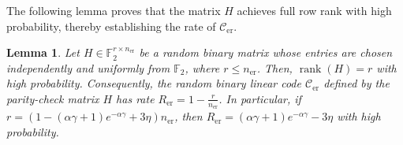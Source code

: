 \documentclass[journal,letterpaper,onecolumn,11pt]{IEEEtran}
\newcommand{\cC}{\mathcal{C}}
\newtheorem{lemma}{Lemma}
\begin{document}
The following lemma proves that the matrix $H$ achieves full row rank with high probability, thereby establishing the rate of $\cC_{\mathrm{er}}$.

\begin{lemma}\label{lemma:full rank random parity matrix}
Let $H\in\mathbb{F}_2^{r\times n_{\mathrm{er}}}$ be a random binary matrix
whose entries are chosen independently and uniformly from $\mathbb{F}_2$,
where $r\le n_{\mathrm{er}}$. Then, $\operatorname{rank}(H)=r$ with high probability.
Consequently, the random binary linear code $\cC_{\mathrm{er}}$ defined by the
parity-check matrix $H$ has rate
$R_{\mathrm{er}}=1-\frac{r}{n_{\mathrm{er}}}$.
In particular, if
$r=\left(1-(\alpha\gamma+1)e^{-\alpha\gamma}+3\eta\right)n_{\mathrm{er}}$,
then
$R_{\mathrm{er}}=(\alpha\gamma+1)e^{-\alpha\gamma}-3\eta$
with high probability.
\end{lemma}
\end{document}
